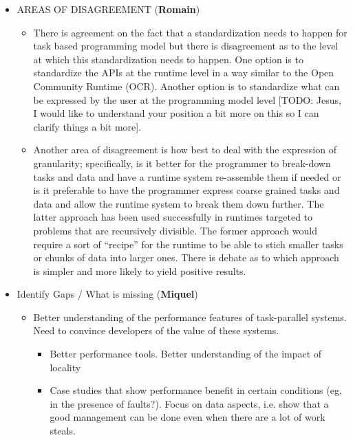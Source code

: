 \begin{itemize}
	\item AREAS OF DISAGREEMENT (\textbf{Romain})
          \begin{itemize}
            \item{
                There is agreement on the fact that a standardization
needs to happen for task based programming model but there is
disagreement as to the level at which this standardization needs to
happen. One option is to standardize the APIs at the runtime level in
a way similar to the Open Community Runtime (OCR). Another option is
to standardize what can be expressed by the user at the programming
model level [TODO: Jesus, I would like to understand your position a
bit more on this so I can clarify things a bit more].
              }
            \item{
                Another area of disagreement is how best to deal with
 the expression of granularity; specifically, is it better for the
 programmer to break-down tasks and data and have a runtime system
 re-assemble them if needed or is it preferable to have the programmer
express coarse grained tasks and data and allow the runtime system to
break them down further. The latter approach has been used
successfully in runtimes targeted to problems that are recursively
divisible. The former approach would require a sort of ``recipe'' for
the runtime to be able to stich smaller tasks or chunks of data into
larger ones. There is debate as to which approach is simpler and more
likely to yield positive results.
              }
            \end{itemize}



	\item Identify Gaps / What is missing  (\textbf{Miquel})
	    \begin{itemize}
		\item Better understanding of the performance features of task-parallel
		systems. Need to convince developers of the value of these systems.
		\begin{itemize}
		  \item Better performance tools. Better understanding of the impact of locality
		  \item Case studies that show performance benefit in certain conditions (eg,
		    in the presence of faults?). Focus on data aspects, i.e. show that
		    a good management can be done even when there are a lot of work steals.
	      \end{itemize}
	  \end{itemize}



\end{itemize}
